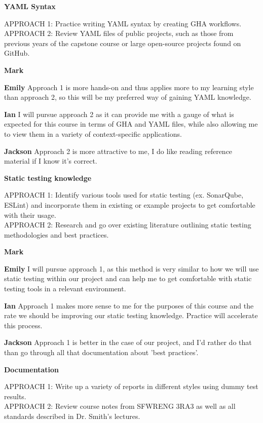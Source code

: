 \documentclass[12pt, titlepage]{article}
\begin{document}
\begin{enumerate}[leftmargin=*]
  \vspace{10pt}
  \textbf{YAML Syntax}

  APPROACH 1: Practice writing YAML syntax by creating GHA workflows. \\
  APPROACH 2: Review YAML files of public projects, such as those from previous years of the capstone course or large open-source projects found on GitHub.
  
  \textbf{Mark}

  \textbf{Emily} Approach 1 is more hands-on and thus applies more to my learning style than approach 2, so this will be my preferred way of gaining YAML knowledge.

  \textbf{Ian} I will pursue approach 2 as it can provide me with a gauge of what is expected for this course in terms of GHA and YAML files, while also allowing me 
  to view them in a variety of context-specific applications.

  \textbf{Jackson} Approach 2 is more attractive to me, I do like reading reference material if I know it's correct.

  \vspace{10pt}
  \textbf{Static testing knowledge}

  APPROACH 1: Identify various tools used for static testing (ex. SonarQube, ESLint) and incorporate them in existing or example projects to get comfortable with their usage. \\
  APPROACH 2: Research and go over existing literature outlining static testing methodologies and best practices.

  \textbf{Mark}

  \textbf{Emily} I will pursue approach 1, as this method is very similar to how we will use static testing within our project and can help me to get comfortable with static testing tools in a relevant environment.

  \textbf{Ian} Approach 1 makes more sense to me for the purposes of this course and the rate we should be improving our static testing knowledge. Practice will accelerate this process.

  \textbf{Jackson} Approach 1 is better in the case of our project, and I'd rather do that than go through all that documentation about 'best practices'.

  \vspace{10pt}
  \textbf{Documentation}

  APPROACH 1: Write up a variety of reports in different styles using dummy test results. \\
  APPROACH 2: Review course notes from SFWRENG 3RA3 as well as all standards described in Dr. Smith’s lectures.


\end{enumerate}
\end{document}
